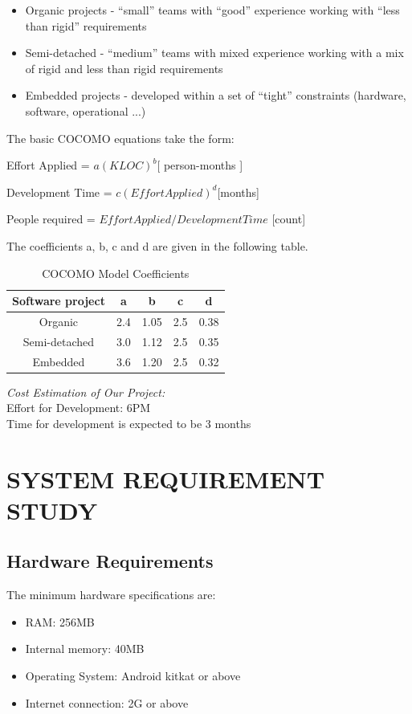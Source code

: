 \documentclass[12pt,a4paper,oneside]{report}
\newcommand{\quotes}[1]{``#1''}
\begin{document}
\begin{itemize}
\item Organic projects - \quotes{small} teams with \quotes{good} experience working with \quotes{less than rigid} requirements
\item Semi-detached - \quotes{medium} teams with mixed experience working with a mix of rigid and less than rigid requirements
\item Embedded projects - developed within a set of \quotes{tight} constraints (hardware, software, operational ...)
\end{itemize}
\par The basic COCOMO equations take the form:\\ 
\par Effort Applied = $a(KLOC)^b$[ person-months ]\\
\par Development Time = $c(Effort Applied)^d$[months]\\
\par People required = $Effort Applied / Development Time$ [count]\\
\par The coefficients a, b, c and d are given in the following table.\\
\begin{table}[!htb]
\centering
\caption{COCOMO Model Coefficients}
\label{COCOMO Model Coeffficients}
\begin{tabular}{ccccc}

\toprule
Software project & a & b & c & d\\
\midrule
\midrule
Organic   & 2.4 & 1.05 & 2.5 & 0.38\\
Semi-detached & 3.0 & 1.12 & 2.5 & 0.35\\
Embedded & 3.6 & 1.20 & 2.5 & 0.32\\
\bottomrule
\end{tabular}
\end{table}
\textit{Cost Estimation of Our Project:}\\
Effort for Development: 6PM \\
Time for development is expected to be 3 months\\
\section{SYSTEM REQUIREMENT STUDY}
\subsection{ Hardware Requirements}
 The minimum hardware specifications are:
\begin{itemize}
\item  RAM: 256MB
\item Internal memory: 40MB
\item Operating System: Android kitkat or above
\item Internet connection: 2G or above
\end{itemize}
\end{document}
